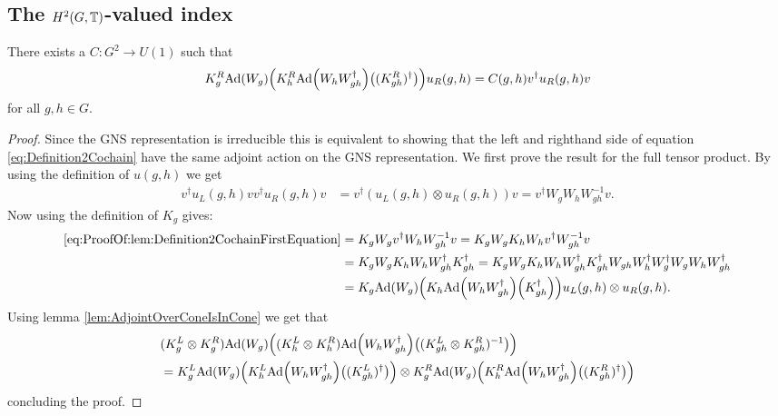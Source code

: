 \documentclass[11pt,a4paper,twoside]{article}
\numberwithin{equation}{section}
\begin{document}
	\subsection{The \texorpdfstring{$H^2(G,\mathbb T)$}{}-valued index}\label{sec:DefinitionH2Index}
	\begin{lemma}\label{lem:Definition2Cochain}
		There exists a $C:G^2\rightarrow U(1)$ such that 
		\begin{equation}\label{eq:Definition2Cochain}
			K_g^R\Ad{W_g}\left(K_h^R\Ad{W_hW_{gh}^\dagger}\left((K_{gh}^R)^\dagger\right)\right)u_
			R(g,h)=C(g,h)v^\dagger u_R(g,h)v
		\end{equation}
		for all $g,h\in G.$
	\end{lemma}
	\begin{proof}
		Since the GNS representation is irreducible this is equivalent to showing that the left and righthand side of equation \eqref{eq:Definition2Cochain} have the same adjoint action on the GNS representation. We first prove the result for the full tensor product. By using the definition of $u(g,h)$ we get
		\begin{align}\label{eq:ProofOf:lem:Definition2CochainFirstEquation}
			v^\dagger u_L(g,h)v v^\dagger u_R(g,h) v&=v^\dagger (u_L(g,h)\otimes u_R(g,h)) v =v^\dagger W_g W_h W_{gh}^{-1}v.
		\end{align}
		Now using the definition of $K_g$ gives:
		\begin{align}
			\eqref{eq:ProofOf:lem:Definition2CochainFirstEquation}&=K_gW_g v^\dagger W_h W_{gh}^{-1}v=K_gW_g K_h W_h v^\dagger W_{gh}^{-1}v\\
			&=K_gW_g K_h W_h W_{gh}^\dagger K_{gh}^\dagger=K_gW_g K_h W_h W_{gh}^\dagger K_{gh}^\dagger W_{gh}W_h^\dagger W_g^\dagger W_gW_hW_{gh}^\dagger\\
			&=K_g\Ad{W_g}\left(K_h\Ad{W_hW_{gh}^\dagger}\left(K_{gh}^\dagger\right)\right)u_L(g,h)\otimes u_
			R(g,h).
		\end{align}
		Using lemma \ref{lem:AdjointOverConeIsInCone} we get that
		\begin{align}
			&(K_g^L\otimes K_g^R)\Ad{W_g}\left((K_h^L\otimes K_h^R)\Ad{W_hW_{gh}^\dagger}\left((K_{gh}^L\otimes K_{gh}^R)^{-1}\right)\right)\\
			&=K_g^L\Ad{W_g}\left(K_h^L\Ad{W_hW_{gh}^\dagger}\left((K_{gh}^L)^\dagger\right)\right)\otimes K_g^R\Ad{W_g}\left(K_h^R\Ad{W_hW_{gh}^\dagger}\left((K_{gh}^R)^\dagger\right)\right)
		\end{align}
		concluding the proof.
	\end{proof}
\end{document}

